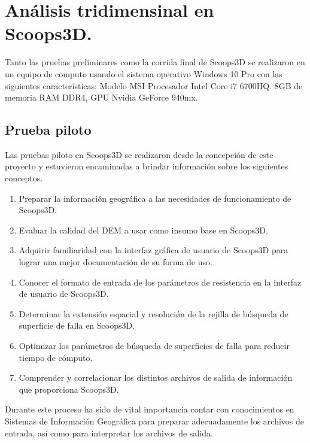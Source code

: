 \chapter{An\'alisis tridimensinal en Scoops3D.}
\label{chap_analisisEnScoops}

Tanto las pruebas preliminares como la corrida final de Scoops3D se realizaron en un equipo de computo usando el sistema operativo Windows 10 Pro con las siguientes caracter\'{i}sticas: Modelo MSI Procesador Intel Core i7 6700HQ. 8GB de memoria RAM DDR4, GPU Nvidia GeForce 940mx.

\section{Prueba piloto} 

Las pruebas piloto en Scoops3D se realizaron desde la concepci\'on de este proyecto y estuvieron encaminadas a brindar informaci\'on sobre los siguientes conceptos.

\begin{enumerate}
  \item Preparar la informaci\'{\o}n geogr\'{a}fica a las necesidades de funcionamiento de Scoops3D.
  \item Evaluar la calidad del DEM a usar como insumo base en Scoops3D.
  \item Adquirir familiaridad con la interfaz gr\'{a}fica de usuario de Scoops3D para lograr una mejor documentaci\'on de su forma de uso.
  \item Conocer el formato de entrada de los par\'{a}metros de resistencia en la interfaz de usuario de Scoops3D.
  \item Determinar la extensi\'on espacial y resoluci\'{\o}n de la rejilla de b\'{u}squeda de superficie de falla en Scoops3D.
  \item Optimizar los par\'{a}metros de b\'{u}squeda de superficies de falla para reducir tiempo de c\'omputo.
  \item Comprender y correlacionar los distintos archivos de salida de informaci\'{\o}n que proporciona Scoops3D.
\end{enumerate}

Durante este proceso ha sido de vital importancia contar con conocimientos en Sistemas de Informaci\'on Geogr\'afica para preparar adecuadamente los archivos de entrada, as\'i como para interpretar los archivos de salida.
